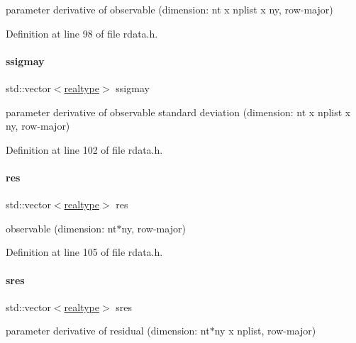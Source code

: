parameter derivative of observable (dimension\+: nt x nplist x ny, row-\/major) 

Definition at line 98 of file rdata.\+h.

\mbox{\label{classamici_1_1_return_data_a7a8085d13686e18d9575fabf3a289e10}} 
\paragraph{\texorpdfstring{ssigmay}{ssigmay}}
{\footnotesize\ttfamily std\+::vector$<$\mbox{\hyperlink{namespaceamici_a1bdce28051d6a53868f7ccbf5f2c14a3}{realtype}}$>$ ssigmay}

parameter derivative of observable standard deviation (dimension\+: nt x nplist x ny, row-\/major) 

Definition at line 102 of file rdata.\+h.

\mbox{\label{classamici_1_1_return_data_ac3a3eb1d5c3af27a82a144086eafc832}} 
\paragraph{\texorpdfstring{res}{res}}
{\footnotesize\ttfamily std\+::vector$<$\mbox{\hyperlink{namespaceamici_a1bdce28051d6a53868f7ccbf5f2c14a3}{realtype}}$>$ res}

observable (dimension\+: nt$\ast$ny, row-\/major) 

Definition at line 105 of file rdata.\+h.

\mbox{\label{classamici_1_1_return_data_a799ab0ed6276a81d6c3afd20654f8193}} 
\paragraph{\texorpdfstring{sres}{sres}}
{\footnotesize\ttfamily std\+::vector$<$\mbox{\hyperlink{namespaceamici_a1bdce28051d6a53868f7ccbf5f2c14a3}{realtype}}$>$ sres}

parameter derivative of residual (dimension\+: nt$\ast$ny x nplist, row-\/major) 

